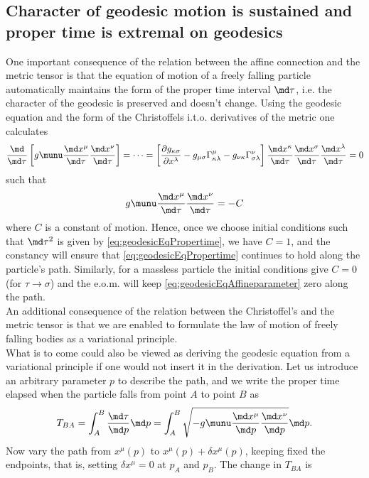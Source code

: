 \subsection{Character of geodesic motion is sustained and proper time is extremal on geodesics}
One important consequence of the relation between the affine connection and the metric tensor is that the equation of motion of a freely falling particle automatically maintains the form of the proper time interval $\md \tau$, i.e. the character of the geodesic is preserved and doesn't change. Using the geodesic equation and the form of the Christoffels i.t.o. derivatives of the metric one calculates
\begin{equation}
	\frac{\md}{\md \tau} \left[g\munu \frac{\md x^\mu}{\md \tau} \frac{\md x^\nu}{\md \tau}\right] = \dots = \left[\frac{\partial g_{\kappa \sigma}}{\partial x^\lambda} - g_{\mu \sigma } \Gamma^\mu_{\kappa \lambda} - g_{\nu \kappa} \Gamma^\nu_{\sigma \lambda} \right] \frac{\md x^\kappa}{\md \tau} \frac{\md x^\sigma}{\md \tau} \frac{\md x^\lambda}{\md \tau} = 0
\end{equation}
such that
\begin{equation}
	g\munu \frac{\md x^\mu}{\md \tau} \frac{\md x^\nu}{\md \tau} = -C
\end{equation}
where $C$ is a constant of motion. Hence, once we choose initial conditions such that $\md \tau^2$ is given by \ref{eq:geodesicEqPropertime}, we have $C=1$, and the constancy will ensure that \ref{eq:geodesicEqPropertime} continues to hold along the particle's path. Similarly, for a massless particle the initial conditions give $C=0$ (for $\tau \rightarrow \sigma$) and the e.o.m. will keep \ref{eq:geodesicEqAffineparameter} zero along the path.\\
An additional consequence of the relation between the Christoffel's and the metric tensor is that we are enabled to formulate the law of motion of freely falling bodies as a variational principle. \\
What is to come could also be viewed as deriving the geodesic equation from a variational principle if one would not insert it in the derivation.
Let us introduce an arbitrary parameter $p$ to describe the path, and we write the proper time elapsed when the particle falls from point $A$ to point $B$ as
\begin{equation}
	T_{BA} = \int_A^B \frac{\md \tau}{\md p} \md p = \int_A^B \sqrt{-g\munu \frac{\md x^\mu}{\md p} \frac{\md x^\nu}{\md p}} \md p.
\end{equation}
Now vary the path from $x^\mu(p)$ to $x^\mu(p) + \delta x^\mu(p)$, keeping fixed the endpoints, that is, setting $\delta x^\mu = 0$ at $p_A$ and $p_B$. The change in $T_{BA}$ is
